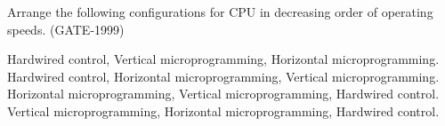 \begin{questyle}
  \question  Arrange the following configurations for CPU in decreasing order of operating speeds.  (GATE-1999)

  \begin{choices}
    \choice         Hardwired control, Vertical microprogramming, Horizontal microprogramming.
    \CorrectChoice  Hardwired control, Horizontal microprogramming, Vertical microprogramming.
    \choice         Horizontal microprogramming, Vertical microprogramming, Hardwired control.
    \choice         Vertical microprogramming, Horizontal microprogramming, Hardwired control.
  \end{choices}
\end{questyle}


\begin{comment}


\begin{questyle}
  \question  zzz  (GATE-zzz)

  \begin{choices}
    \choice         zzz
    \choice         zzz
    \choice         zzz
    \choice         zzz
\CorrectChoice
  \end{choices}
\end{questyle}

\begin{questyle}
  \question  zzz  (GATE-zzz)

  \begin{choices}
    \choice         zzz
    \choice         zzz
    \choice         zzz
    \choice         zzz
\CorrectChoice
  \end{choices}
\end{questyle}

\begin{questyle}
  \question  zzz  (GATE-zzz)

  \begin{choices}
    \choice         zzz
    \choice         zzz
    \choice         zzz
    \choice         zzz
\CorrectChoice
  \end{choices}
\end{questyle}

\end{comment}




